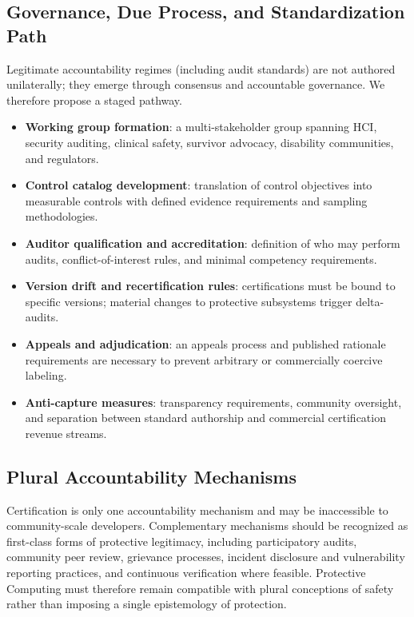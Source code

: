 \documentclass[12pt]{article}
\begin{document}
\subsection{Governance, Due Process, and Standardization Path}
\label{sec:protective-governance}
Legitimate accountability regimes (including audit standards) are not authored unilaterally; they emerge through consensus and accountable governance. We therefore propose a staged pathway.
\begin{itemize}
\item \textbf{Working group formation}: a multi-stakeholder group spanning HCI, security auditing, clinical safety, survivor advocacy, disability communities, and regulators.
\item \textbf{Control catalog development}: translation of control objectives into measurable controls with defined evidence requirements and sampling methodologies.
\item \textbf{Auditor qualification and accreditation}: definition of who may perform audits, conflict-of-interest rules, and minimal competency requirements.
\item \textbf{Version drift and recertification rules}: certifications must be bound to specific versions; material changes to protective subsystems trigger delta-audits.
\item \textbf{Appeals and adjudication}: an appeals process and published rationale requirements are necessary to prevent arbitrary or commercially coercive labeling.
\item \textbf{Anti-capture measures}: transparency requirements, community oversight, and separation between standard authorship and commercial certification revenue streams.
\end{itemize}

\subsection{Plural Accountability Mechanisms}
Certification is only one accountability mechanism and may be inaccessible to community-scale developers. Complementary mechanisms should be recognized as first-class forms of protective legitimacy, including participatory audits, community peer review, grievance processes, incident disclosure and vulnerability reporting practices, and continuous verification where feasible. Protective Computing must therefore remain compatible with plural conceptions of safety rather than imposing a single epistemology of protection.
\end{document}
